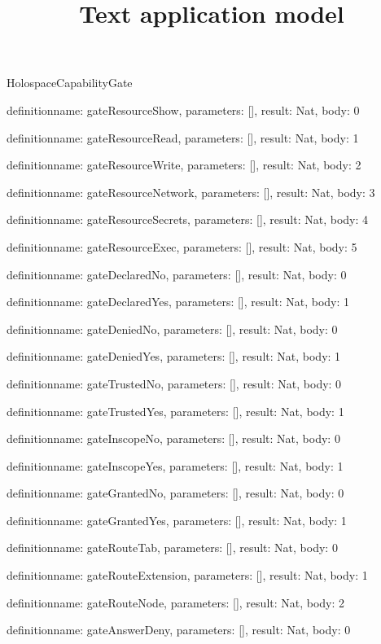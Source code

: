 \begin{lexlean}{HolospaceCapabilityGate}
\title{Text application model}
\begin{semanticmodule}
definition{name: gateResourceShow, parameters: [], result: Nat, body: 0}

definition{name: gateResourceRead, parameters: [], result: Nat, body: 1}

definition{name: gateResourceWrite, parameters: [], result: Nat, body: 2}

definition{name: gateResourceNetwork, parameters: [], result: Nat, body: 3}

definition{name: gateResourceSecrets, parameters: [], result: Nat, body: 4}

definition{name: gateResourceExec, parameters: [], result: Nat, body: 5}

definition{name: gateDeclaredNo, parameters: [], result: Nat, body: 0}

definition{name: gateDeclaredYes, parameters: [], result: Nat, body: 1}

definition{name: gateDeniedNo, parameters: [], result: Nat, body: 0}

definition{name: gateDeniedYes, parameters: [], result: Nat, body: 1}

definition{name: gateTrustedNo, parameters: [], result: Nat, body: 0}

definition{name: gateTrustedYes, parameters: [], result: Nat, body: 1}

definition{name: gateInscopeNo, parameters: [], result: Nat, body: 0}

definition{name: gateInscopeYes, parameters: [], result: Nat, body: 1}

definition{name: gateGrantedNo, parameters: [], result: Nat, body: 0}

definition{name: gateGrantedYes, parameters: [], result: Nat, body: 1}

definition{name: gateRouteTab, parameters: [], result: Nat, body: 0}

definition{name: gateRouteExtension, parameters: [], result: Nat, body: 1}

definition{name: gateRouteNode, parameters: [], result: Nat, body: 2}

definition{name: gateAnswerDeny, parameters: [], result: Nat, body: 0}


\end{semanticmodule}
\end{lexlean}
